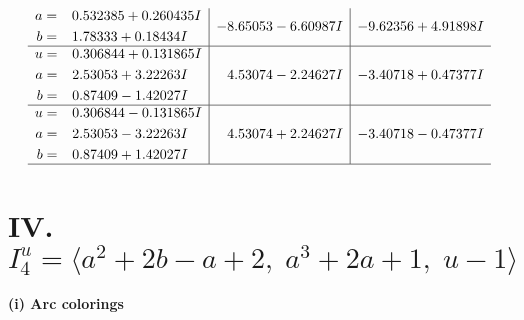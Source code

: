 \documentclass[1p]{elsarticle_modified}
\theoremstyle{definition}
\begin{document}
$$\begin{array}{c|c|c}
\begin{aligned}
a &= \phantom{-}0.532385 + 0.260435 I \\
b &= \phantom{-}1.78333 + 0.18434 I\end{aligned}
 & -8.65053 - 6.60987 I & -9.62356 + 4.91898 I \\ \hline\begin{aligned}
u &= \phantom{-}0.306844 + 0.131865 I \\
a &= \phantom{-}2.53053 + 3.22263 I \\
b &= \phantom{-}0.87409 - 1.42027 I\end{aligned}
 & \phantom{-}4.53074 - 2.24627 I & -3.40718 + 0.47377 I \\ \hline\begin{aligned}
u &= \phantom{-}0.306844 - 0.131865 I \\
a &= \phantom{-}2.53053 - 3.22263 I \\
b &= \phantom{-}0.87409 + 1.42027 I\end{aligned}
 & \phantom{-}4.53074 + 2.24627 I & -3.40718 - 0.47377 I\\
 \hline 
 \end{array}$$\newpage\newpage\renewcommand{\arraystretch}{1}
\centering \section*{IV. $I^u_{4}= \langle a^2+2 b- a+2,\;a^3+2 a+1,\;u-1 \rangle$}
\flushleft \textbf{(i) Arc colorings}\\
\end{document}
